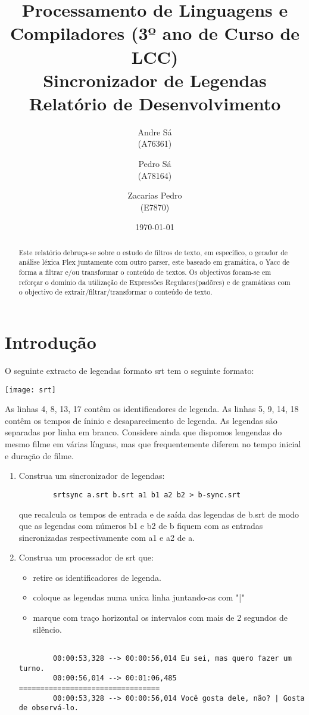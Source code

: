 \documentclass{report}
\title{Processamento de Linguagens e Compiladores (3º ano de Curso de LCC)\\ \textbf{Sincronizador de Legendas}\\ Relatório de Desenvolvimento}
\author{Andre Sá\\ (A76361) \and Pedro Sá\\ (A78164) \and Zacarias Pedro\\ (E7870) }
\date{\today}
\begin{document}
\maketitle

\begin{abstract}
Este relatório debruça-se sobre o estudo de filtros de texto, em específico, o gerador de análise léxica Flex juntamente com outro parser, este baseado em gramática, o Yacc de forma a filtrar e/ou transformar o conteúdo de textos.
Os objectivos focam-se em reforçar o domínio da utilização de Expressões Regulares(padõres) e de gramáticas com o objectivo de extrair/filtrar/transformar o conteúdo de texto.
\end{abstract}

\tableofcontents

\chapter{Introdução} \label{intro}
O seguinte extracto de legendas formato srt tem o seguinte formato:
 
 \texttt{[image: srt]}

As linhas 4, 8, 13, 17 contêm os identificadores de legenda. As linhas 5, 9, 14, 18 contêm os tempos de íninio e desaparecimento de legenda.
As legendas são separadas por linha em branco. Considere ainda que dispomos lengendas do mesmo filme em várias línguas, mas que frequentemente diferem no tempo inicial e duração de filme.

\begin{enumerate}[1.]
    \item Construa um sincronizador de legendas: 
        \begin{verbatim} 
        srtsync a.srt b.srt a1 b1 a2 b2 > b-sync.srt 
        \end{verbatim}
        que recalcula os tempos de entrada e de saída das legendas de b.srt de modo que as legendas com números b1 e b2 de b fiquem com as entradas sincronizadas respectivamente com a1 e a2 de a.

    \item Construa um processador de srt que: 
        \begin{itemize}  
            \item{retire os identificadores de legenda.}  
            \item{coloque as legendas numa unica linha juntando-as com "|"}
            \item{marque com traço horizontal os intervalos com mais de 2 segundos de silêncio.}  
        \end{itemize}
        \begin{verbatim}

        00:00:53,328 --> 00:00:56,014 Eu sei, mas quero fazer um turno.
        00:00:56,014 --> 00:01:06,485 =================================
        00:00:53,328 --> 00:00:56,014 Você gosta dele, não? | Gosta de observá-lo.
        \end{verbatim}
\end{enumerate}
\end{document}
